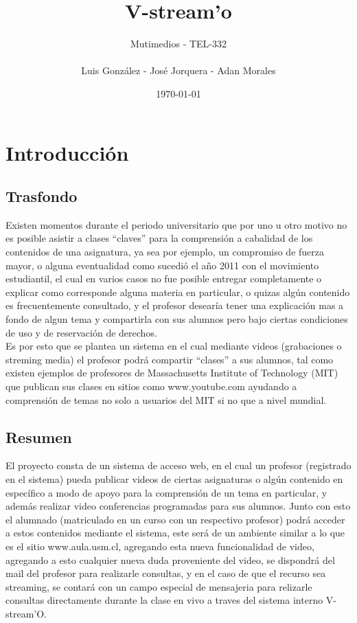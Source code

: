 \documentclass[12pt]{article}
\title{V-stream'o}
\author{Mutimedios - TEL-332\\\\Luis González - José Jorquera - Adan Morales}
\date{\today}
\begin{document}
\maketitle
\thispagestyle{empty}

\newpage
\section{Introducción}
\subsection{Trasfondo}
Existen momentos durante el periodo universitario que por uno u otro motivo no es posible asistir a clases 
``claves'' para la comprensión a cabalidad de los contenidos de una asignatura, ya sea por ejemplo, un 
compromiso de fuerza mayor, o alguna eventualidad como sucedió el a\~no 2011 con el movimiento estudiantil, 
el cual en varios casos no fue posible entregar completamente o explicar como corresponde alguna materia 
en particular, o quizas algún contenido es frecuentemente consultado, y el profesor desearía tener una 
explicación mas a fondo de algun tema y compartirla con sus alumnos pero bajo ciertas condiciones de uso
y de reservación de derechos.\\

Es por esto que se plantea un sistema en el cual mediante videos (grabaciones o streming media) el profesor
podrá compartir ``clases'' a sus alumnos, tal como existen ejemplos de profesores de Massachusetts Institute of Technology (MIT) que publican sus clases en sitios como www.youtube.com ayudando a comprensión de temas
no solo a usuarios del MIT si no que a nivel mundial.

\subsection{Resumen}
El proyecto consta de un sistema de acceso web, en el cual un profesor (registrado en el sistema) pueda 
publicar videos de ciertas asignaturas o algún contenido en específico a modo de apoyo para la comprensión
de un tema en particular, y además realizar video conferencias programadas para sus alumnos. Junto con esto
el alumnado (matriculado en un curso con un respectivo profesor) podrá acceder a estos contenidos mediante
el sistema, este será de un ambiente similar a lo que es el sitio www.aula.usm.cl, agregando esta nueva
funcionalidad de video, agregando a esto cualquier nueva duda proveniente del video, se dispondrá del mail 
del profesor para realizarle consultas, y en el caso de que el recurso sea streaming, se contará con un campo
especial de mensajeria para relizarle consultas directamente durante la clase en vivo a traves del sistema
interno V-stream'O.
\end{document}

